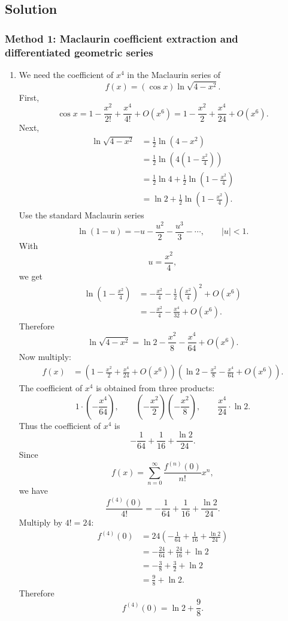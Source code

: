 \documentclass[12pt]{article}
\begin{document}
\newpage
\subsection{Solution}

\subsubsection{Method 1: Maclaurin coefficient extraction and differentiated geometric series}

\begin{enumerate}[label=(\alph*)]
\item We need the coefficient of $x^4$ in the Maclaurin series of
\[
f(x)=(\cos x)\ln\sqrt{4-x^2}.
\]
First,
\[
\cos x
=
1-\frac{x^2}{2!}+\frac{x^4}{4!}+O(x^6)
=
1-\frac{x^2}{2}+\frac{x^4}{24}+O(x^6).
\]
Next,
\begin{align*}
\ln\sqrt{4-x^2}
&=
\frac12\ln(4-x^2)\\
&=
\frac12\ln\left(4\left(1-\frac{x^2}{4}\right)\right)\\
&=
\frac12\ln 4
+
\frac12\ln\left(1-\frac{x^2}{4}\right)\\
&=
\ln 2
+
\frac12\ln\left(1-\frac{x^2}{4}\right).
\end{align*}
Use the standard Maclaurin series
\[
\ln(1-u)
=
-u-\frac{u^2}{2}-\frac{u^3}{3}-\cdots,
\qquad |u|<1.
\]
With
\[
u=\frac{x^2}{4},
\]
we get
\begin{align*}
\ln\left(1-\frac{x^2}{4}\right)
&=
-\frac{x^2}{4}
-\frac12\left(\frac{x^2}{4}\right)^2
+O(x^6)\\
&=
-\frac{x^2}{4}
-\frac{x^4}{32}
+O(x^6).
\end{align*}
Therefore
\[
\ln\sqrt{4-x^2}
=
\ln 2-\frac{x^2}{8}-\frac{x^4}{64}+O(x^6).
\]
Now multiply:
\begin{align*}
f(x)
&=
\left(1-\frac{x^2}{2}+\frac{x^4}{24}+O(x^6)\right)
\left(\ln 2-\frac{x^2}{8}-\frac{x^4}{64}+O(x^6)\right).
\end{align*}
The coefficient of $x^4$ is obtained from three products:
\[
1\cdot\left(-\frac{x^4}{64}\right),
\qquad
\left(-\frac{x^2}{2}\right)\left(-\frac{x^2}{8}\right),
\qquad
\frac{x^4}{24}\cdot \ln 2.
\]
Thus the coefficient of $x^4$ is
\[
-\frac1{64}
+
\frac1{16}
+
\frac{\ln 2}{24}.
\]
Since
\[
f(x)=\sum_{n=0}^{\infty}\frac{f^{(n)}(0)}{n!}x^n,
\]
we have
\[
\frac{f^{(4)}(0)}{4!}
=
-\frac1{64}
+
\frac1{16}
+
\frac{\ln 2}{24}.
\]
Multiply by $4!=24$:
\begin{align*}
f^{(4)}(0)
&=
24\left(
-\frac1{64}
+
\frac1{16}
+
\frac{\ln 2}{24}
\right)\\
&=
-\frac{24}{64}
+
\frac{24}{16}
+
\ln 2\\
&=
-\frac38+\frac32+\ln 2\\
&=
\frac98+\ln 2.
\end{align*}
Therefore
\[
\boxed{f^{(4)}(0)=\ln 2+\frac98.}
\]


\end{enumerate}
\end{document}
